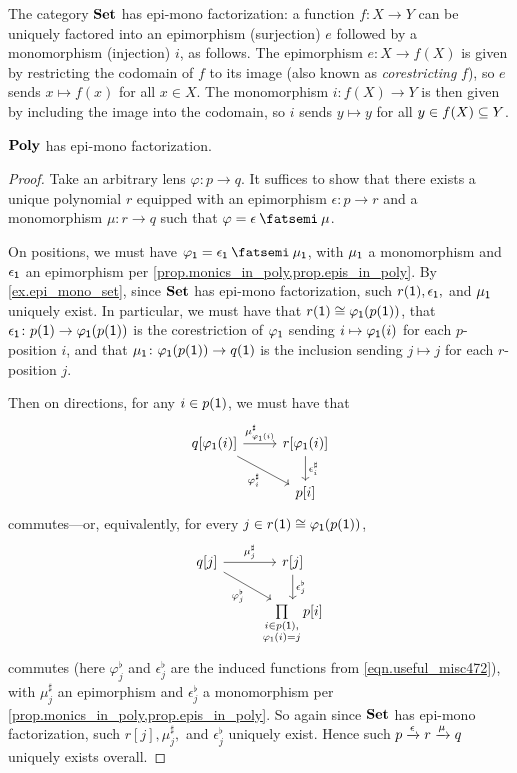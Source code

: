 \documentclass[Book-Poly]{subfiles}
\begin{document}
\begin{example} \label{ex.epi_mono_set}
The category $\smset$ has epi-mono factorization: a function $f\colon X\to Y$ can be uniquely factored into an epimorphism (surjection) $e$ followed by a monomorphism (injection) $i$, as follows.
The epimorphism $e\colon X\to f(X)$ is given by restricting the codomain of $f$ to its image (also known as \emph{corestricting} $f$), so $e$ sends $x\mapsto f(x)$ for all $x\in X$.
The monomorphism $i\colon f(X)\to Y$ is then given by including the image into the codomain, so $i$ sends $y\mapsto y$ for all $y\in f(X)\ss Y$.
\end{example}

\begin{proposition}
$\poly$ has epi-mono factorization.
\end{proposition}
\begin{proof}
Take an arbitrary lens $\varphi\colon p\to q$.
It suffices to show that there exists a unique polynomial $r$ equipped with an epimorphism $\epsilon\colon p\to r$ and a monomorphism $\mu\colon r\to q$ such that $\varphi=\epsilon\then\mu$.

On positions, we must have $\varphi_\1 = \epsilon_\1\then\mu_\1$, with $\mu_\1$ a monomorphism and $\epsilon_\1$ an epimorphism per \cref{prop.monics_in_poly,prop.epis_in_poly}.
By \cref{ex.epi_mono_set}, since $\smset$ has epi-mono factorization, such $r(\1), \epsilon_\1,$ and $\mu_\1$ uniquely exist.
In particular, we must have that $r(\1)\iso \varphi_\1(p(\1))$, that $\epsilon_\1\colon p(\1)\to\varphi_\1(p(\1))$ is the corestriction of $\varphi_\1$ sending $i\mapsto\varphi_\1(i)$ for each $p$-position $i$, and that $\mu_\1\colon\varphi_\1(p(\1))\to q(\1)$ is the inclusion sending $j\mapsto j$ for each $r$-position $j$.

Then on directions, for any $i\in p(\1)$, we must have that
\[
\begin{tikzcd}
    q[\varphi_\1(i)] \ar[r, "\mu^\sharp_{\varphi_\1(i)}"] \ar[dr, "\varphi^\sharp_i"'] & r[\varphi_\1(i)] \ar[d, "\epsilon^\sharp_i"] \\
    & p[i]
\end{tikzcd}
\]
commutes---or, equivalently, for every $j\in r(\1)\iso\varphi_\1(p(\1))$,
\[
\begin{tikzcd}
    q[j] \ar[r, "\mu^\sharp_j"] \ar[dr, "\varphi^\flat_j"'] & r[j] \ar[d, "\epsilon^\flat_j"] \\
    & \prod\limits_{\substack{i\in p(\1), \\ \varphi_\1(i)=j}} p[i]
\end{tikzcd}
\]
commutes (here $\varphi^\flat_j$ and $\epsilon^\flat_j$ are the induced functions from \eqref{eqn.useful_misc472}), with $\mu_j^\sharp$ an epimorphism and $\epsilon^\flat_j$ a monomorphism per
\cref{prop.monics_in_poly,prop.epis_in_poly}.
So again since $\smset$ has epi-mono factorization, such $r[j], \mu^\sharp_j,$ and $\epsilon^\flat_j$ uniquely exist.
Hence such $p \To{\epsilon} r \To{\mu} q$ uniquely exists overall.
\end{proof}
\end{document}
